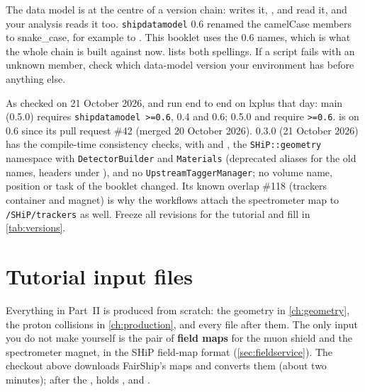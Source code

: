 \begin{pitfall}
The data model is at the centre of a version chain:  writes it,
,  and  read it, and your analysis
reads it too. \texttt{shipdatamodel} 0.6 renamed the camelCase members to
snake\_case, for example  to . This booklet
uses the 0.6 names, which is what the whole chain is built against now.
 lists both spellings. If a script fails with an
unknown member, check which data-model version your environment has before
anything else.
\end{pitfall}

\begin{organisernote}
As checked on 21 October 2026, and run end to end on lxplus that day:  main (0.5.0) requires
\texttt{shipdatamodel >=0.6},  0.4 and
 0.6;  0.5.0 and  require
\texttt{>=0.6}.  is on 0.6 since its pull request \#42
(merged 20 October 2026).  0.3.0 (21 October 2026) has
the compile-time consistency checks,  with  and
, the \texttt{SHiP::geometry} namespace with
\texttt{DetectorBuilder} and \texttt{Materials} (deprecated aliases for the
old names, headers under ), and no
\texttt{UpstreamTaggerManager}; no volume name, position or task of the
booklet changed. Its known overlap \#118 (trackers container and magnet) is
why the workflows attach the spectrometer map to \texttt{/SHiP/trackers} as
well.
Freeze all revisions for the tutorial and fill in \cref{tab:versions}.
\end{organisernote}

\section{Tutorial input files}

Everything in Part~II is produced from scratch: the geometry in
\cref{ch:geometry}, the proton collisions in \cref{ch:production}, and every
file after them. The only input you do not make yourself is the pair of
\textbf{field maps} for the muon shield and the spectrometer magnet, in the
SHiP field-map format (\cref{sec:fieldservice}). The 
checkout above downloads FairShip's maps and converts them (about two
minutes); after the ,  holds
,  and
.

